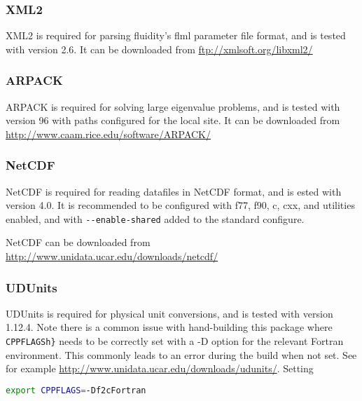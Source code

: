 \subsubsection{XML2}
\label{sect:required_libraries_supporting_xml2}

XML2 is required for parsing fluidity's flml parameter file format, and is
tested with version 2.6. It can be downloaded from \url{ftp://xmlsoft.org/libxml2/}

\subsubsection{ARPACK}
\label{sect:required_libraries_supporting_arpack}

ARPACK is required for solving large eigenvalue problems, and is tested with
version 96 with paths configured for the local site. It can be downloaded from
\url{http://www.caam.rice.edu/software/ARPACK/}

\subsubsection{NetCDF}
\label{sect:required_libraries_supporting_netcdf}

NetCDF is required for reading datafiles in NetCDF format, and is ested with
version 4.0. It is recommended to be configured with f77, f90, c, cxx, and
utilities enabled, and with \lstinline[language=bash]+--enable-shared+ added to
the standard configure. 

NetCDF can be downloaded from \url{http://www.unidata.ucar.edu/downloads/netcdf/}

\subsubsection{UDUnits}
\label{sect:required_libraries_supporting_udunits}

UDUnits is required for physical unit conversions, and is tested with version
1.12.4. Note there is a common issue with hand-building this package where
\lstinline[language=bash]+CPPFLAGSh}+ needs to be correctly set with a -D
option for the relevant Fortran environment. This commonly leads to an error
during the build when not set. See for example
\url{http://www.unidata.ucar.edu/downloads/udunits/}.  Setting

\begin{lstlisting}[language=bash]
export CPPFLAGS=-Df2cFortran
\end{lstlisting}


